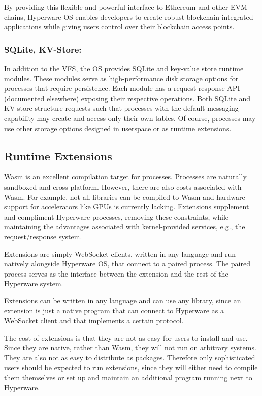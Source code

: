 \documentclass[runningheads]{llncs}
\begin{document}
By providing this flexible and powerful interface to Ethereum and other EVM chains, Hyperware OS enables developers to create robust blockchain-integrated applications while giving users control over their blockchain access points.

\subsubsection{SQLite, KV-Store:}
\label{sec:osdbs}

In addition to the VFS, the OS provides SQLite and key-value store runtime modules.
These modules serve as high-performance disk storage options for processes that require persistence.
Each module has a request-response API (documented elsewhere) exposing their respective operations.
Both SQLite and KV-store structure requests such that processes with the default messaging capability may create and access only their own tables.
Of course, processes may use other storage options designed in userspace or as runtime extensions.

\subsection{Runtime Extensions}
\label{sec:osextensions}

Wasm is an excellent compilation target for processes.
Processes are naturally sandboxed and cross-platform.
However, there are also costs associated with Wasm.
For example, not all libraries can be compiled to Wasm and hardware support for accelerators like GPUs is currently lacking.
Extensions supplement and compliment Hyperware processes, removing these constraints, while maintaining the advantages associated with kernel-provided services, e.g., the request/response system.

Extensions are simply WebSocket clients, written in any language and run natively alongside Hyperware OS, that connect to a paired process.
The paired process serves as the interface between the extension and the rest of the Hyperware system.

Extensions can be written in any language and can use any library, since an extension is just a native program that can connect to Hyperware as a WebSocket client and that implements a certain protocol.

The cost of extensions is that they are not as easy for users to install and use.
Since they are native, rather than Wasm, they will not run on arbitrary systems.
They are also not as easy to distribute as packages.
Therefore only sophisticated users should be expected to run extensions, since they will either need to compile them themselves or set up and maintain an additional program running next to Hyperware.
\end{document}
